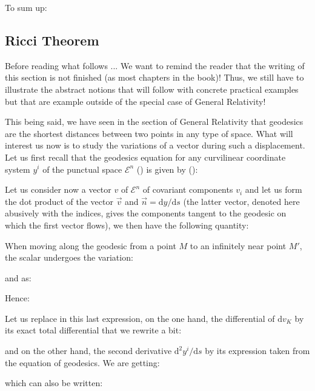 	
	\begin{tcolorbox}[colframe=black,colback=white,sharp corners]
	To sum up:
	
	\end{tcolorbox}
	
	\subsection{Ricci Theorem}
	\begin{tcolorbox}[colback=red!5,borderline={1mm}{2mm}{red!5},arc=0mm,boxrule=0pt]
	\bcbombe Before reading what follows ... We want to remind the reader that the writing of this section is not finished (as most chapters in the book)! Thus, we still have to illustrate the abstract notions that will follow with concrete practical examples but that are example outside of the special case of General Relativity!
	\end{tcolorbox}
	This being said, we have seen in the section of General Relativity that geodesics are the shortest distances between two points in any type of space. What will interest us now is to study the variations of a vector during such a displacement. Let us first recall that the geodesics equation for any curvilinear coordinate system $y^i$ of the punctual space $\mathcal{E}^n$ () is given by ():
	
	Let us consider now a vector $v$ of $\mathcal{E}^n$ of covariant components $v_i$ and let us form the dot product of the vector $\vec{v}$ and $\vec{n}=\mathrm{d}y/\mathrm{d}s$ (the latter vector, denoted here abusively with the indices, gives the components tangent to the geodesic on which the first vector flows), we then have the following quantity:
	
	When moving along the geodesic from a point $M$ to an infinitely near point $M'$, the scalar undergoes the variation:
	
	and as:
	
	Hence:
	
	Let us replace in this last expression, on the one hand, the differential of $\mathrm{d}v_K$ by its exact total differential that we rewrite a bit:
	
	and on the other hand, the second derivative $\mathrm{d}^2y^i/\mathrm{d}s$ by its expression taken from the equation of geodesics. We are getting:
	
	which can also be written:
	
